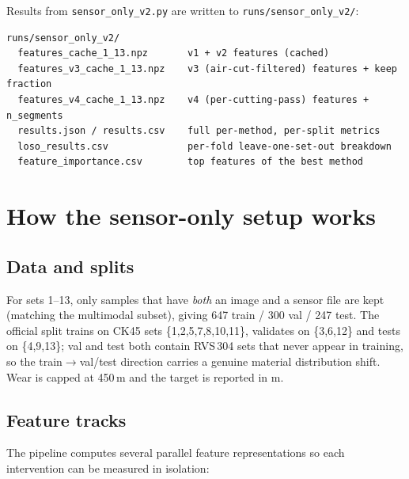 \documentclass[11pt,a4paper]{article}
\newcommand{\code}[1]{\texttt{#1}}
\newcommand{\um}{\,\textmu m}
\begin{document}
Results from \code{sensor\_only\_v2.py} are written to
\code{runs/sensor\_only\_v2/}:

\begin{lstlisting}
runs/sensor_only_v2/
  features_cache_1_13.npz       v1 + v2 features (cached)
  features_v3_cache_1_13.npz    v3 (air-cut-filtered) features + keep fraction
  features_v4_cache_1_13.npz    v4 (per-cutting-pass) features + n_segments
  results.json / results.csv    full per-method, per-split metrics
  loso_results.csv              per-fold leave-one-set-out breakdown
  feature_importance.csv        top features of the best method
\end{lstlisting}

\section{How the sensor-only setup works}

\subsection{Data and splits}
For sets 1--13, only samples that have \emph{both} an image and a sensor file
are kept (matching the multimodal subset), giving 647 train / 300 val / 247
test. The official split trains on CK45 sets \{1,2,5,7,8,10,11\}, validates on
\{3,6,12\} and tests on \{4,9,13\}; val and test both contain RVS\,304 sets
that never appear in training, so the train$\to$val/test direction carries a
genuine material distribution shift. Wear is capped at 450\um{} and the target
is reported in \textmu m.

\subsection{Feature tracks}
The pipeline computes several parallel feature representations so each
intervention can be measured in isolation:
\end{document}
